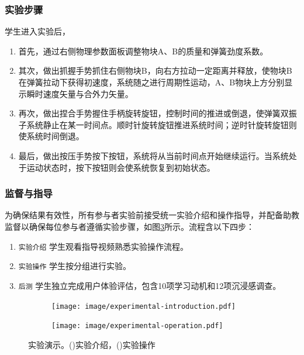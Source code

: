 \documentclass[runningheads]{llncs}
\begin{document}
\subsubsection{实验步骤}
学生进入实验后，

\begin{enumerate}[label=$\bullet$]
  \item 首先，通过右侧物理参数面板调整物块A、B的质量和弹簧劲度系数。
  \item 其次，做出抓握手势抓住右侧物块B，向右方拉动一定距离并释放，使物块B在弹簧拉动下获得初速度，系统随之进行周期性运动，A、B物块上方分别显示瞬时速度矢量与合外力矢量。
  \item 再次，做出捏合手势握住手柄旋转旋钮，控制时间的推进或倒退，使弹簧双振子系统静止在某一时间点。顺时针旋转旋钮推进系统时间；逆时针旋转旋钮则使系统时间倒退。
  \item 最后，做出按压手势按下按钮，系统将从当前时间点开始继续运行。当系统处于运动状态时，按下按钮则会使系统恢复到初始状态。
\end{enumerate}

\subsubsection{监督与指导}
为确保结果有效性，所有参与者实验前接受统一实验介绍和操作指导，并配备助教监督以确保每位参与者遵循实验步骤，如图\ref{fig:experimental-procedure}所示。流程含以下四步：

\begin{enumerate}[label={\arabic*)}]
\item \texttt{实验介绍} 学生观看指导视频熟悉实验操作流程。
\item \texttt{实验操作} 学生按分组进行实验。
\item \texttt{后测} 学生独立完成用户体验评估，包含10项学习动机和12项沉浸感调查。
\end{enumerate}

\begin{figure}
  \begin{subfigure}{0.48\linewidth}
    \centering
    \texttt{[image: image/experimental-introduction.pdf]}
    \caption{}
    \label{fig:experimental-introduction}
  \end{subfigure}
  \hfill
  \begin{subfigure}{0.48\linewidth}
    \centering
    \texttt{[image: image/experimental-operation.pdf]}
    \caption{}
    \label{fig:experimental-operation}
  \end{subfigure}
  \caption{实验演示。()实验介绍，()实验操作}
  \label{fig:experimental-procedure}
\end{figure}
\end{document}
